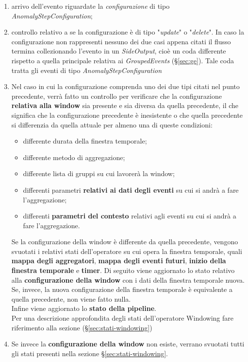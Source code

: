 \begin{enumerate}
	\item{arrivo dell'evento riguardate la \textit{configurazione} di tipo \textit{AnomalyStepConfiguration};}
	\item{controllo relativo a se la configurazione è di tipo "\textit{update}" o "\textit{delete}". In caso la configurazione non rappresenti nessuno dei due casi appena citati il flusso termina collezionando l'evento in un \textit{SideOutput}, cioè un coda differente rispetto a quella principale relativa ai \textit{GroupedEvents} (\S\ref{sec:ge}). Tale coda tratta gli eventi di tipo \textit{AnomalyStepConfiguration}}
	\item{Nel caso in cui la configurazione comprenda uno dei due tipi citati nel punto precedente, verrà fatto un controllo per verificare che la configurazione \textbf{relativa alla window} sia presente e sia diversa da quella precedente, il che significa che la configurazione precedente è inesistente o che quella precedente si differenzia da quella attuale per almeno una di queste condizioni:
	\begin{itemize}
		\item{differente durata della finestra temporale;}
		\item{differente metodo di aggregazione;}
		\item{differente lista di gruppi su cui lavorerà la window;}
		\item{differenti parametri \textbf{relativi ai dati degli eventi} su cui si andrà a fare l'aggregazione;}
		\item{differenti \textbf{parametri del contesto} relativi agli eventi su cui si andrà a fare l'aggregazione.}
	\end{itemize}
	
Se la configurazione della window è differente da quella precedente, vengono svuotati i relativi stati dell'operatore su cui opera la finestra temporale, quali \textbf{mappa degli aggregatori}, \textbf{mappa degli eventi futuri}, \textbf{inizio della finestra temporale} e \textbf{timer}. Di seguito viene aggiornato lo stato relativo alla \textbf{configurazione della window} con i dati della finestra temporale nuova.\\
Se, invece, la nuova configurazione della finestra temporale è equivalente a quella precedente, non viene fatto nulla.\\
Infine viene aggiornato lo \textbf{stato della \gls{pipeline}}.\\
Per una descrizione approfondita degli stati dell'operatore Windowing fare riferimento alla sezione (\S\ref{sec:stati-windowing})
}
\item{Se invece la \textbf{configurazione della window} non esiste, verrano svuotati tutti gli stati presenti nella sezione \S\ref{sec:stati-windowing}.}
\end{enumerate}

